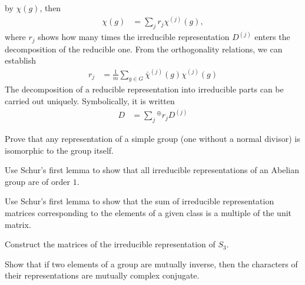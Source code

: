 \begin{enumerate}
    by $\chi(g)$, then
    \begin{align}
        \chi(g)&=\sum_j r_j\chi^{(j)}(g),
    \end{align}
    where $r_j$ shows how many times the irreducible representation $D^{(j)}$
    enters the decomposition of the reducible one.
    From the orthogonality relations, we can establish
    \begin{align}
        r_j&=\frac1m\sum_{g\in G}\bar{\chi}^{(j)}(g)\chi^{(j)}(g)
    \end{align}
    The decomposition of a reducible representation into irreducible parts can be
    carried out uniquely. Symbolically, it is written
    \begin{align}
        D&=\sum_j{}^{\oplus}r_jD^{(j)}
    \end{align}
\end{enumerate}




\begin{exercise}
    Prove that any representation of a simple group (one without a normal divisor)
    is isomorphic to the group
    itself.
\end{exercise}

\begin{exercise}
    Use Schur's first lemma to show that all irreducible representations of an
    Abelian group are of order $1$.
\end{exercise}

\begin{exercise}
    Use Schur's first lemma to show that the sum of irreducible representation
    matrices corresponding to the elements of a given class is a multiple of the
    unit matrix.
\end{exercise}

\begin{exercise}
    Construct the matrices of the irreducible representation of $S_3$.
\end{exercise}

\begin{exercise}
    Show that if two elements of a group are mutually inverse, then the
    characters of their representations are mutually complex conjugate.
\end{exercise}
